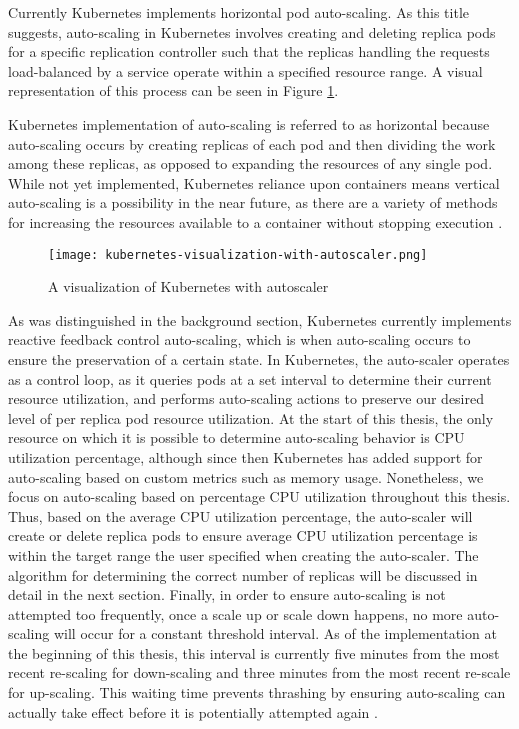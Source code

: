 Currently Kubernetes implements horizontal pod auto-scaling.
As this title suggests, auto-scaling in
Kubernetes involves creating and deleting replica pods for a specific replication
controller such that the replicas handling the requests load-balanced by a service
operate within a specified resource range. A visual representation of this
process can be seen in Figure \ref{fig:kubernetes-visualization-with-autoscaler}.

Kubernetes implementation of auto-scaling is referred to as horizontal because
auto-scaling occurs by creating replicas of each pod and then dividing the work
among these replicas, as opposed to expanding the resources of any single pod.
While not yet implemented, Kubernetes reliance upon containers means vertical
auto-scaling is a possibility in the near future, as there are a variety of
methods for increasing the resources available to a container without stopping
execution \cite{docker-up-and-running}.

\begin{figure}[!h]
  \centerline{\texttt{[image: kubernetes-visualization-with-autoscaler.png]}}
  \caption{A visualization of Kubernetes with autoscaler}
  \label{fig:kubernetes-visualization-with-autoscaler}
\end{figure}

As was distinguished in the background section, Kubernetes currently implements reactive
feedback control auto-scaling, which is when auto-scaling occurs to
ensure the preservation of a certain state.
In Kubernetes, the auto-scaler operates as a control loop,
as it queries pods at a set interval to determine
their current resource utilization, and performs auto-scaling actions to
preserve our desired level of per replica pod resource utilization.
At the start of this thesis, the only resource on which it is possible to
determine auto-scaling behavior is CPU utilization percentage, although since
then Kubernetes has added support for auto-scaling based on custom metrics such
as memory usage. Nonetheless, we focus on auto-scaling based on percentage CPU
utilization throughout this thesis.
Thus, based on the average CPU utilization percentage, the
auto-scaler will create or delete replica pods to ensure average CPU utilization
percentage is within the target range the user specified when creating the
auto-scaler. The algorithm for determining the correct number of replicas
will be discussed in detail in the next section. Finally,
in order to ensure auto-scaling is not attempted too frequently, once a
scale up or scale down happens, no more auto-scaling will occur for a constant
threshold interval. As of the implementation at the beginning of this thesis,
this interval is currently five minutes from the most recent
re-scaling for down-scaling and three minutes from the most recent re-scale for
up-scaling. This waiting time prevents thrashing by ensuring
auto-scaling can actually take effect before it is potentially attempted again
\cite{k8s-horizontal-pod-autoscaler-user-guide}.
